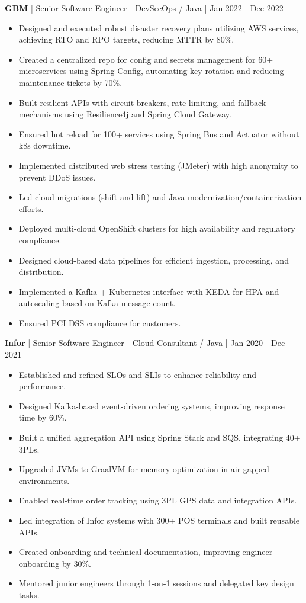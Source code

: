\documentclass[a4paper,10pt]{article}
\begin{document}
\textbf{GBM} | Senior Software Engineer - DevSecOps / Java | Jan 2022 - Dec 2022
\begin{itemize}
    \item Designed and executed robust disaster recovery plans utilizing AWS services, achieving RTO and RPO targets, reducing MTTR by 80\%.
    \item Created a centralized repo for config and secrets management for 60+ microservices using Spring Config, automating key rotation and reducing maintenance tickets by 70\%.
    \item Built resilient APIs with circuit breakers, rate limiting, and fallback mechanisms using Resilience4j and Spring Cloud Gateway.
    \item Ensured hot reload for 100+ services using Spring Bus and Actuator without k8s downtime.
    \item Implemented distributed web stress testing (JMeter) with high anonymity to prevent DDoS issues.
    \item Led cloud migrations (shift and lift) and Java modernization/containerization efforts.
    \item Deployed multi-cloud OpenShift clusters for high availability and regulatory compliance.
    \item Designed cloud-based data pipelines for efficient ingestion, processing, and distribution.
    \item Implemented a Kafka + Kubernetes interface with KEDA for HPA and autoscaling based on Kafka message count.
    \item Ensured PCI DSS compliance for customers.
\end{itemize}


\textbf{Infor} | Senior Software Engineer - Cloud Consultant / Java | Jan 2020 - Dec 2021
\begin{itemize}
    \item Established and refined SLOs and SLIs to enhance reliability and performance.
    \item Designed Kafka-based event-driven ordering systems, improving response time by 60\%.
    \item Built a unified aggregation API using Spring Stack and SQS, integrating 40+ 3PLs.
    \item Upgraded JVMs to GraalVM for memory optimization in air-gapped environments.
    \item Enabled real-time order tracking using 3PL GPS data and integration APIs.
    \item Led integration of Infor systems with 300+ POS terminals and built reusable APIs.
    \item Created onboarding and technical documentation, improving engineer onboarding by 30\%.
    \item Mentored junior engineers through 1-on-1 sessions and delegated key design tasks.
\end{itemize}
\end{document}
